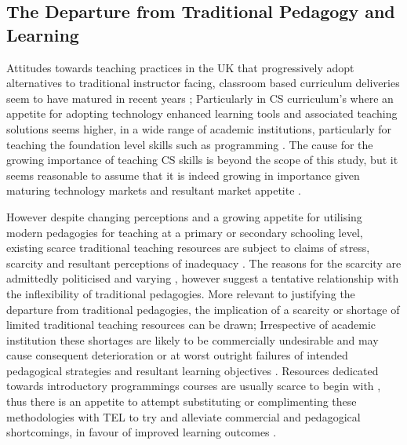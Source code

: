 \label{sec:sec01}
\subsection{The Departure from Traditional Pedagogy and Learning}
\label{subsec:subsec01}

Attitudes towards teaching practices in the UK that progressively adopt alternatives to traditional instructor facing, classroom based curriculum deliveries seem to have matured in recent years \cite{Jessica2012,CinYeeHoo,Stuart2014}; Particularly in CS curriculum's where an appetite for adopting technology enhanced learning tools and associated teaching solutions seems higher, in a wide range of academic institutions, particularly for teaching the foundation level skills such as programming \cite{Ibanez2014,Serrano-Laguna2015,Bittencourt2015,Chigona2008,CinYeeHoo,Jessica2012,Stuart2014}. The cause for the growing importance of teaching CS skills is beyond the scope of this study, but it seems reasonable to assume that it is indeed growing in importance given maturing technology markets and resultant market appetite  \cite{CinYeeHoo,Stuart2014,Jessica2012}.

However despite changing perceptions and a growing appetite for utilising modern pedagogies for teaching at a primary or secondary schooling level, existing scarce traditional teaching resources are subject to claims of stress, scarcity and  resultant perceptions of inadequacy \cite{CinYeeHoo}. The reasons for the scarcity are admittedly politicised and varying \cite{Stuart2014,CinYeeHoo,Jessica2012}, however suggest a tentative relationship with the inflexibility of traditional pedagogies. More relevant to justifying the departure from traditional pedagogies, the implication of a scarcity or shortage  of limited traditional teaching resources can be drawn; Irrespective of academic institution these shortages are likely to be commercially undesirable and may cause consequent deterioration or at worst outright failures of intended pedagogical strategies and resultant learning objectives \cite{Gordon2014,CinYeeHoo,Stuart2014}. Resources dedicated towards introductory programmings courses are usually scarce to begin with\cite{Chigona2008} , thus there is an appetite to attempt substituting or complimenting these methodologies with TEL to try and alleviate commercial and pedagogical shortcomings, in favour of improved learning outcomes \cite{Chigona2008,Hackelbusch2007,Serrano-Laguna2015,Bittencourt2015,RickReis,Chat2014}.

